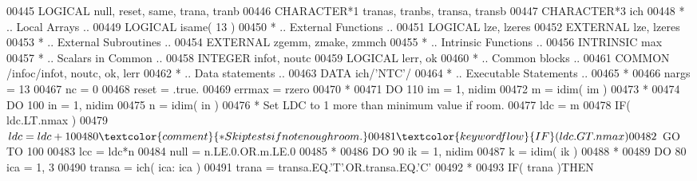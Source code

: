 \begin{DoxyCode}
00445       \textcolor{keywordtype}{LOGICAL}            null, reset, same, trana, tranb
00446       \textcolor{keywordtype}{CHARACTER*1}        tranas, tranbs, transa, transb
00447       \textcolor{keywordtype}{CHARACTER*3}        ich
00448 \textcolor{comment}{*     .. Local Arrays ..}
00449       \textcolor{keywordtype}{LOGICAL}            isame( 13 )
00450 \textcolor{comment}{*     .. External Functions ..}
00451       \textcolor{keywordtype}{LOGICAL}            lze, lzeres
00452       \textcolor{keywordtype}{EXTERNAL}           lze, lzeres
00453 \textcolor{comment}{*     .. External Subroutines ..}
00454       \textcolor{keywordtype}{EXTERNAL}           zgemm, zmake, zmmch
00455 \textcolor{comment}{*     .. Intrinsic Functions ..}
00456       \textcolor{keywordtype}{INTRINSIC}          max
00457 \textcolor{comment}{*     .. Scalars in Common ..}
00458       \textcolor{keywordtype}{INTEGER}            infot, noutc
00459       \textcolor{keywordtype}{LOGICAL}            lerr, ok
00460 \textcolor{comment}{*     .. Common blocks ..}
00461       \textcolor{keyword}{COMMON}             /infoc/infot, noutc, ok, lerr
00462 \textcolor{comment}{*     .. Data statements ..}
00463       \textcolor{keyword}{DATA}               ich/\textcolor{stringliteral}{'NTC'}/
00464 \textcolor{comment}{*     .. Executable Statements ..}
00465 \textcolor{comment}{*}
00466       nargs = 13
00467       nc = 0
00468       reset = .true.
00469       errmax = rzero
00470 \textcolor{comment}{*}
00471       \textcolor{keywordflow}{DO} 110 im = 1, nidim
00472          m = idim( im )
00473 \textcolor{comment}{*}
00474          \textcolor{keywordflow}{DO} 100 in = 1, nidim
00475             n = idim( in )
00476 \textcolor{comment}{*           Set LDC to 1 more than minimum value if room.}
00477             ldc = m
00478             \textcolor{keywordflow}{IF}( ldc.LT.nmax )
00479      $         ldc = ldc + 1
00480 \textcolor{comment}{*           Skip tests if not enough room.}
00481             \textcolor{keywordflow}{IF}( ldc.GT.nmax )
00482      $         \textcolor{keywordflow}{GO TO} 100
00483             lcc = ldc*n
00484             null = n.LE.0.OR.m.LE.0
00485 \textcolor{comment}{*}
00486             \textcolor{keywordflow}{DO} 90 ik = 1, nidim
00487                k = idim( ik )
00488 \textcolor{comment}{*}
00489                \textcolor{keywordflow}{DO} 80 ica = 1, 3
00490                   transa = ich( ica: ica )
00491                   trana = transa.EQ.\textcolor{stringliteral}{'T'}.OR.transa.EQ.\textcolor{stringliteral}{'C'}
00492 \textcolor{comment}{*}
00493                   \textcolor{keywordflow}{IF}( trana )\textcolor{keywordflow}{THEN}

\end{DoxyCode}
